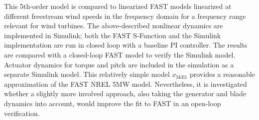 %
This 5th-order model is compared to linearized FAST models linearized at different freestream wind speeds in the frequency domain for a frequency range relevant for wind turbines. The above-described nonlinear dynamics are implemented in Simulink; both the FAST S-Function and the Simulink implementation are run in closed loop with a baseline PI controller. The results are compared with a closed-loop FAST model to verify the Simulink model. Actuator dynamics for torque and pitch are included in the simulation as a separate Simulink model.
%
This relatively simple model $x_{\text{Mdl1}}$ provides a reasonable approximation of the FAST NREL 5MW model. Nevertheless, it is investigated whether a slightly more involved approach, also taking the generator and blade dynamics into account, would improve the fit to FAST in an open-loop verification.

